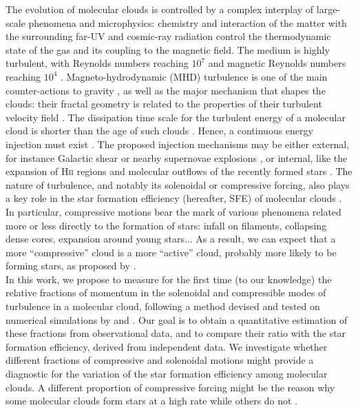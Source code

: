 \documentclass[structabstract]{aa}
\newcommand{\emm}[1]{\ensuremath{#1}}
\newcommand{\emr}[1]{\emm{\mathrm{#1}}}
\newcommand{\unit}[1]{\emr{\,#1}}
\newcommand{\Myr}{\unit{Myr}}
\newcommand{\Hii}{\textsc{Hii}}
\begin{document}
The evolution of molecular clouds is controlled by a complex interplay of large-scale phenomena and microphysics: chemistry and interaction of the matter with the surrounding far-UV and cosmic-ray radiation control the thermodynamic state of the gas and its coupling to the magnetic field. The medium is highly turbulent, with Reynolds numbers reaching $10^7$ and magnetic Reynolds numbers reaching $10^4$ \citep{draine11}. Magneto-hydrodynamic (MHD) turbulence is one of the main counter-actions to gravity \citep{hennebelle12,federrath12,padoan14}, as well as the major mechanism that shapes the clouds: their fractal geometry is related to the properties of their turbulent velocity field \citep{pety00,federrath09}. The dissipation time scale for the turbulent energy of a molecular cloud is shorter \citep[$\sim 1\Myr$,][]{maclow99} than the age of such clouds \citep[$\sim 20-30\Myr$,][]{larson81}. Hence, a continuous energy injection must exist \citep[and references therein]{hennebelle12}. The proposed injection mechanisms may be either external, for instance Galactic shear or nearby supernovae explosions \citep{kim15}, or internal, like the expansion of \Hii{} regions and molecular outflows of the recently formed stars \citep{hennebelle12}. The nature of turbulence, and notably its solenoidal or compressive forcing, also plays a key role in the star formation efficiency (hereafter, SFE) of molecular clouds \citep{federrath12,federrath13}. In particular, compressive motions bear the mark of various phenomena related more or less directly to the formation of stars: infall on filaments, collapsing dense cores, expansion around young stars... As a result, we can expect that a more ``compressive'' cloud is a more ``active'' cloud, probably more likely to be forming stars, as proposed by \citet{federrath12}.
\\

In this work, we propose to measure for the first time (to our knowledge) the relative fractions of momentum in the solenoidal and compressible modes of turbulence in a molecular cloud, following a method devised and tested on numerical simulations by \citet{brunt10} and \citet{brunt14}. Our goal is to obtain a quantitative estimation of these fractions from observational data, and to compare their ratio with the star formation efficiency, derived from independent data. We investigate whether different fractions of compressive and solenoidal motions might provide a diagnostic for the variation of the star formation efficiency among molecular clouds. A different proportion of compressive forcing might be the reason why some molecular clouds form stars at a high rate while others do not \citep{federrath10,federrath12,renaud14}. 
\end{document}
